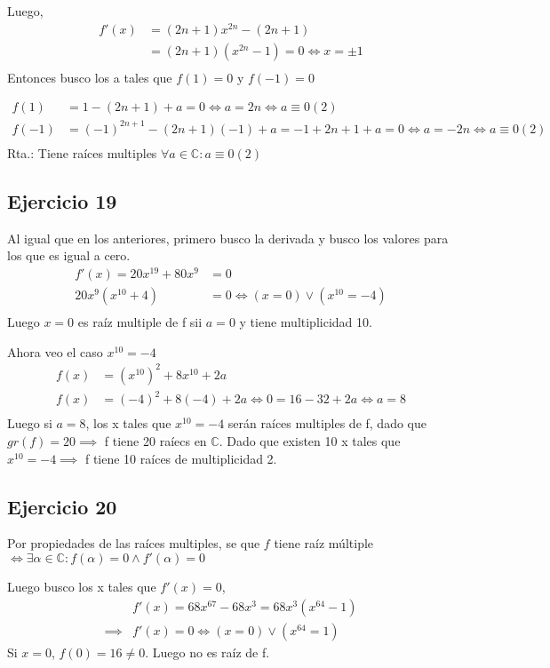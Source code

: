Luego,
\begin{align*}
    f'(x) &= (2n+1)x^{2n} - (2n+1) \\
    &= (2n+1)(x^{2n} - 1) = 0 \iff x = \pm 1 \\
\end{align*}
Entonces busco los a tales que $f(1) = 0$ y $f(-1) = 0$

\begin{align*}
    f(1) &= 1-(2n+1) +a = 0 \iff a = 2n \iff a \equiv 0(2)\\
    f(-1) &= (-1)^{2n+1}-(2n+1)(-1) +a = -1+2n+1+a = 0 \iff a = -2n \iff a \equiv 0(2) \\
\end{align*}
Rta.: Tiene raíces multiples $ \forall a \in \mathbb{C}: a \equiv 0(2) $

\subsection{Ejercicio 19}
Al igual que en los anteriores, primero busco la derivada y busco los valores para los que es igual a cero.
\begin{align*}
    f'(x) = 20x^{19} + 80x^9 &= 0 \\
    20x^{9}(x^{10} + 4) &= 0 \iff (x = 0) \vee (x^{10} = -4) \\
\end{align*}
Luego $ x = 0 $ es raíz multiple de f sii $a = 0$ y tiene multiplicidad 10.

Ahora veo el caso $ x^{10} = -4 $
\begin{align*}
    f(x) &= (x^{10})^2 +8x^{10} + 2a \\
    f(x) &= (-4)^2 +8(-4) + 2a \iff 0 = 16 - 32 + 2a \iff a = 8 \\
\end{align*}
Luego si $ a = 8 $, los x tales que $ x^{10} = -4 $ serán raíces multiples de f, dado que $gr(f) = 20 \implies $ f tiene 20 raíecs en $\mathbb{C}$. Dado que existen 10 x tales que $x^{10} = -4 \implies $ f tiene 10 raíces de multiplicidad 2.  

\subsection{Ejercicio 20}
Por propiedades de las raíces multiples, se que $f$ tiene raíz múltiple $ \iff \exists \alpha \in \mathbb{C}: f(\alpha) = 0 \wedge f'(\alpha) = 0 $

Luego busco los x tales que $f'(x) = 0$,
\begin{align*}
    &f'(x) = 68x^{67} - 68x^{3} = 68x^3(x^{64}-1) \\
    \implies &f'(x) = 0 \iff (x=0) \vee (x^{64}=1)
\end{align*}
Si $x=0$, $ f(0) = 16 \neq 0 $. Luego no es raíz de f.

